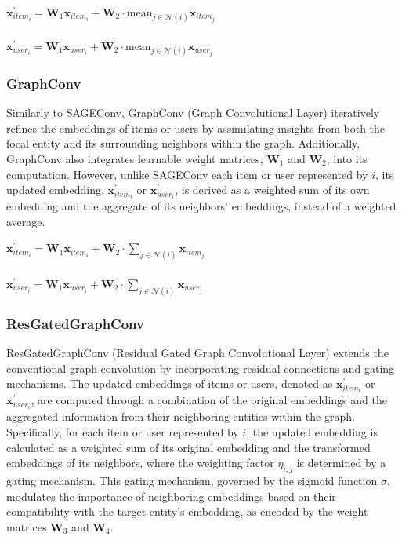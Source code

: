 \documentclass{scrartcl}
\begin{document}
\begin{center}
    $\mathbf{x}^{\prime}_{item_{i}} = \mathbf{W}_1 \mathbf{x}_{item_{i}} + \mathbf{W}_2 \cdot \mathrm{mean}_{j \in \mathcal{N}(i)} \mathbf{x}_{item_{j}}$ \\~\\
    $\mathbf{x}^{\prime}_{user_{i}} = \mathbf{W}_1 \mathbf{x}_{user_{i}} + \mathbf{W}_2 \cdot \mathrm{mean}_{j \in \mathcal{N}(i)} \mathbf{x}_{user_{j}}$
\end{center}

\subsubsection{GraphConv\cite{graphconv}} 

\quad Similarly to SAGEConv, GraphConv (Graph Convolutional Layer) iteratively refines the embeddings of items or users by assimilating insights from both the focal entity and its surrounding neighbors within the graph. Additionally, GraphConv also integrates learnable weight matrices, $\mathbf{W}_1$ and $\mathbf{W}_2$, into its computation. However, unlike SAGEConv each item or user represented by $i$, its updated embedding, $\mathbf{x}^{\prime}_{item_i}$ or $\mathbf{x}^{\prime}_{user_i}$, is derived as a weighted sum of its own embedding and the aggregate of its neighbors' embeddings, instead of a weighted average. \\ 

\begin{center}
    $\mathbf{x}^{\prime}_{item_{i}} = \mathbf{W}_1 \mathbf{x}_{item_{i}} + \mathbf{W}_2 \cdot \sum_{j \in \mathcal{N}(i)} \mathbf{x}_{item_{j}}$ \\~\\
    $\mathbf{x}^{\prime}_{user_{i}} = \mathbf{W}_1 \mathbf{x}_{user_{i}} + \mathbf{W}_2 \cdot \sum_{j \in \mathcal{N}(i)} \mathbf{x}_{user_{j}}$
\end{center}

\subsubsection{ResGatedGraphConv\cite{resgatedgraphconv}} 

\quad ResGatedGraphConv (Residual Gated Graph Convolutional Layer) extends the conventional graph convolution by incorporating residual connections and gating mechanisms. The updated embeddings of items or users, denoted as $\mathbf{x}^{\prime}_{item_i}$ or $\mathbf{x}^{\prime}_{user_i}$, are computed through a combination of the original embeddings and the aggregated information from their neighboring entities within the graph. Specifically, for each item or user represented by $i$, the updated embedding is calculated as a weighted sum of its original embedding and the transformed embeddings of its neighbors, where the weighting factor $\eta_{i,j}$ is determined by a gating mechanism. This gating mechanism, governed by the sigmoid function $\sigma$, modulates the importance of neighboring embeddings based on their compatibility with the target entity's embedding, as encoded by the weight matrices $\mathbf{W}_3$ and $\mathbf{W}_4$. \\ 
\end{document}
